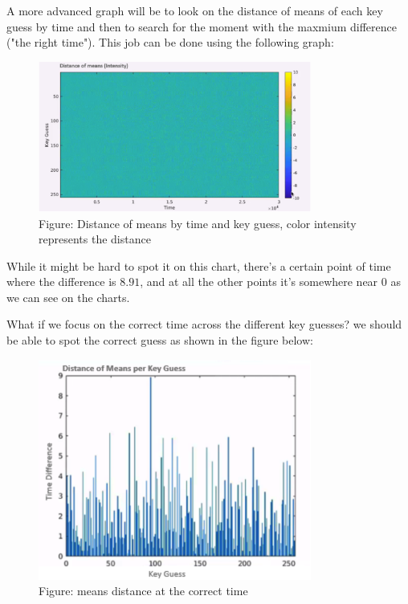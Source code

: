 A more advanced graph will be to look on the distance of means of each key guess by time and then to search for the moment with the maxmium difference ("the right time"). This job can be done using the following graph:
\begin{figure}[H]
\centering
\includegraphics[width=0.8\textwidth]{images/Lecture6/intensity_represents_means_diff.png}
\caption{Figure: Distance of means by time and key guess, color intensity represents the distance}
\label{fig:DPA_Illustration}
\end{figure}
While it might be hard to spot it on this chart, there's a certain point of time where the difference is $8.91$, and at all the other points it's somewhere near 0 as we can see on the charts.

What if we focus on the correct time across the different key guesses? we should be able to spot the correct guess as shown in the figure below:
\begin{figure}[H]
\centering
\includegraphics[width=0.8\textwidth]{images/Lecture6/the-correct-time.png}
\caption{Figure: means distance at the correct time}
\label{fig:DPA_Illustration}
\end{figure}

